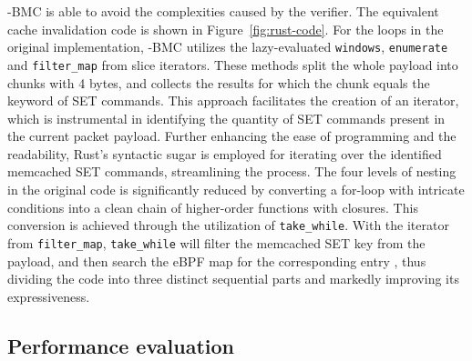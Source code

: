 \projname{}-BMC is able to avoid the complexities caused by the verifier.
The equivalent cache invalidation code is shown in Figure~\ref{fig:rust-code}.
For the loops in the original implementation, \projname{}-BMC utilizes the
    lazy-evaluated \texttt{windows}, \texttt{enumerate} and
    \texttt{filter\_map} from slice iterators.
These methods split the whole payload into chunks
    with 4 bytes, and collects the results for which the chunk equals the keyword
    of SET commands.
This approach facilitates the creation of an iterator, which is instrumental in identifying
    the quantity of SET commands present in the current packet payload.
Further enhancing the ease of programming and the readability, Rust's syntactic sugar is employed for
    iterating over the identified memcached SET commands, streamlining the process.
The four levels of nesting in the original code is significantly reduced by
    converting a for-loop with intricate conditions into a clean chain
    of higher-order functions with closures.
This conversion is achieved through the utilization of \texttt{take\_while}.
    With the iterator from \texttt{filter\_map}, \texttt{take\_while} will
    filter the memcached SET key from the payload, and then search the eBPF map for
    the corresponding entry , thus dividing the code into three distinct
    sequential parts and markedly improving its expressiveness.


\subsection{Performance evaluation}
